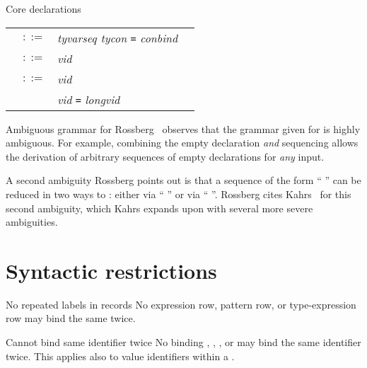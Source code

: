 \begin{grammar}{Core declarations}
\begin{longtable}{rcll}
\label{grammar:datbind}\nonterminal{datbind} & $::=$ &
\textit{tyvarseq tycon} \texttt{=} \textit{conbind} \optional{\texttt{and} \textit{datbind}}\\
\label{grammar:conbind}\nonterminal{conbind} & $::=$ &
\optional{\texttt{op}}\textit{vid} \optional{\texttt{of} \hyperref[grammar:ty]{\textit{ty}}} \optional{\texttt{\char`\|} \textit{datbind}}\\
\label{grammar:exbind}\nonterminal{exbind} & $::=$ &
\optional{\texttt{op}}\textit{vid} \optional{\texttt{of} \hyperref[grammar:ty]{\textit{ty}}} \optional{\texttt{and} \textit{exbind}}\\ 
&\alt&\optional{\texttt{op}}\textit{vid} \texttt{=} \optional{\texttt{op}} \textit{longvid} \optional{\texttt{and} \textit{exbind}}\\ 
\end{longtable}
\end{grammar}


\begin{remark}{Ambiguous grammar for }
Rossberg~\cite{rossbert2018defects} observes that the grammar given for
 is highly ambiguous. For example, combining the empty
declaration \emph{and} sequencing allows the derivation of arbitrary
sequences of empty declarations for \emph{any} input.

A second ambiguity Rossberg points out is that a sequence of the form
``  ''
can be reduced in two ways to : either via
`` '' or via `` ''.
Rossberg cites Kahrs~\cite[\S8.3]{kahrs1993mistakes} for this second
ambiguity, which Kahrs expands upon with several more severe ambiguities.
\end{remark}

\section{Syntactic restrictions}

\begin{clause}{No repeated labels in records}
No expression row, pattern row, or type-expression row may bind the same
 twice.
\end{clause}

\begin{clause}{Cannot bind same identifier twice}
No binding , , , or  may bind the
same identifier twice. This applies also to value identifiers within a
. 
\end{clause}

